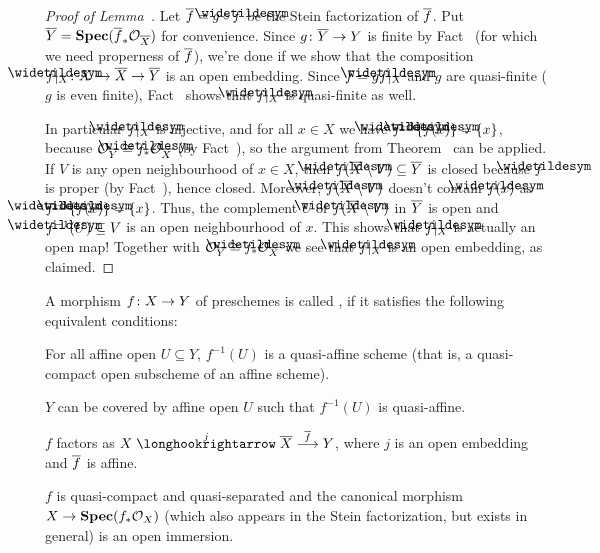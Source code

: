 \documentclass[a4paper,parskip=half,numbers=enddot, DIV=12]{scrreprt}
\begin{document}
\begin{proof}[Proof of Lemma~]
	Let $\ov{f}=g\circ \snake{f}$ be the Stein factorization of $\overline{f}$. Put $\overline{Y}=\operatorname{\mathbf{Spec}}(\overline{f}_*\mathcal{O}_{\overline{X}})$ for convenience. Since $g\colon \ov{Y}\morphism Y$ is finite by Fact~ (for which we need properness of $\overline{f}$), we're done if we show that the composition $\snake{f}|_X\colon X\monomorphism \ov{X}\morphism \ov{Y}$ is an open embedding. Since $f=g\snake{f}|_X$ and $g$ are quasi-finite ($g$ is even finite), Fact~ shows that $\snake{f}|_X$ is quasi-finite as well.
	
	In particular $\snake{f}|_X$ is injective, and for all $x\in X$ we have $\snake{f}^{-1}\{\snake{f}(x)\}=\{x\}$, because $\Oo_{\ov{Y}}\cong \snake{f}_*\Oo_{\ov{X}}$ (by Fact~), so the argument from Theorem~ can be applied. If $V$ is any open neighbourhood of $x\in X$, then $\snake{f}(\ov{X}\setminus V)\subseteq \ov{Y}$ is closed because $\snake{f}$ is proper (by Fact~), hence closed. Moreover, $\snake{f}(\ov{X}\setminus V)$ doesn't contain $\snake{f}(x)$ as $\snake{f}^{-1}\{\snake{f}(x)\}=\{x\}$. Thus, the complement $U$ of $\snake{f}(\ov{X}\setminus V)$ in $\overline{Y}$ is open and $\snake{f}^{-1}(U)\subseteq V$ is an open neighbourhood of $x$. This shows that $\snake{f}|_X$ is actually an open map! Together with $\Oo_{\ov{Y}}\cong \snake{f}_*\Oo_{\ov{X}}$ we see that $\snake{f}|_X$ is an open embedding, as claimed.
\end{proof}
\begin{defi}
	A morphism $f\colon X\morphism Y$ of preschemes is called , if it satisfies the following equivalent conditions:
	\begin{alphanumerate}
		\item For all affine open $U\subseteq Y$, $f^{-1}(U)$ is a quasi-affine scheme (that is, a quasi-compact open subscheme of an affine scheme).
		\item $Y$ can be covered by affine open $U$ such that $f^{-1}(U)$ is quasi-affine.
		\item $f$ factors as $X\monomorphism[j]\ov{X}\morphism[\smash{\ov{f}}]Y$, where $j$ is an open embedding and $\overline{f}$ is affine.
		\item $f$ is quasi-compact and quasi-separated and the canonical morphism $X\morphism\SPEC(f_*\Oo_X)$ (which also appears in the Stein factorization, but exists in general) is an open immersion.
	\end{alphanumerate}
\end{defi}
\end{document}
